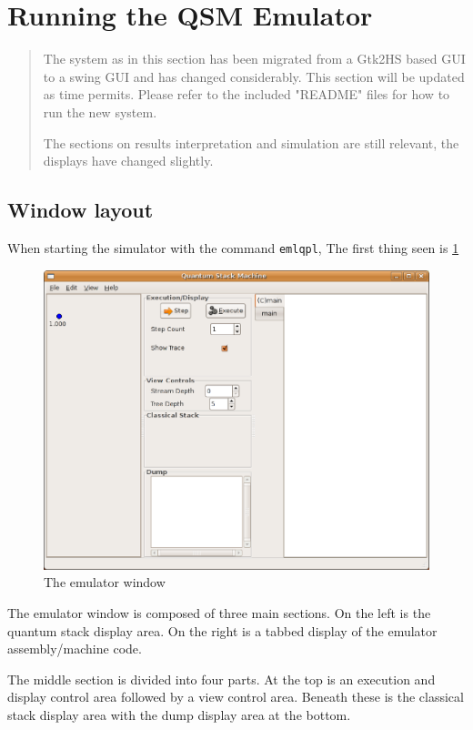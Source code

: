 \section{Running the QSM Emulator}\label{appsec:runningemulator}
\begin{quote}
The system as in this section has been migrated from a Gtk2HS based
GUI to a swing GUI and has changed considerably. This section will be
updated as time permits. Please refer to the included "README" files
for how to run the new system.

The sections on results interpretation and simulation are still relevant,
the displays have changed slightly.

\end{quote}
\subsection{Window layout}
When starting the simulator with the command \texttt{emlqpl},
The first thing seen is \ref{fig:emulator}

\begin{figure}[htbp]
\centering
\includegraphics[scale=.5]{images/emulator/EmulatorAtStart.eps}
\caption{The emulator window}\label{fig:emulator}
\end{figure}

The emulator window is composed of three main sections. On the left is
the quantum stack display area. On the right is a tabbed display of the
emulator assembly/machine code.

The middle section is divided into four parts. At the top is
an execution and display control area followed by a view control area.
Beneath these is the  classical stack display area with
 the dump display area at the bottom.

